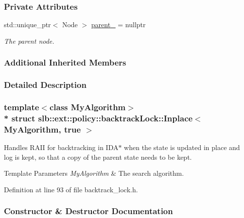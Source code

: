 \subsubsection*{Private Attributes}
\begin{DoxyCompactItemize}
\item 
std\+::unique\+\_\+ptr$<$ Node $>$ \hyperlink{structslb_1_1ext_1_1policy_1_1backtrackLock_1_1Inplace_3_01MyAlgorithm_00_01true_01_4_a3e518436193db41ea16c569828afa795}{parent\+\_\+} = nullptr\hypertarget{structslb_1_1ext_1_1policy_1_1backtrackLock_1_1Inplace_3_01MyAlgorithm_00_01true_01_4_a3e518436193db41ea16c569828afa795}{}\label{structslb_1_1ext_1_1policy_1_1backtrackLock_1_1Inplace_3_01MyAlgorithm_00_01true_01_4_a3e518436193db41ea16c569828afa795}

\begin{DoxyCompactList}\small\item\em The parent node. \end{DoxyCompactList}\end{DoxyCompactItemize}
\subsubsection*{Additional Inherited Members}


\subsubsection{Detailed Description}
\subsubsection*{template$<$class My\+Algorithm$>$\\*
struct slb\+::ext\+::policy\+::backtrack\+Lock\+::\+Inplace$<$ My\+Algorithm, true $>$}

Handles R\+A\+II for backtracking in I\+D\+A$\ast$ when the state is updated in place and log is kept, so that a copy of the parent state needs to be kept. 


\begin{DoxyTemplParams}{Template Parameters}
{\em My\+Algorithm} & The search algorithm. \\
\hline
\end{DoxyTemplParams}


Definition at line 93 of file backtrack\+\_\+lock.\+h.



\subsubsection{Constructor \& Destructor Documentation}

